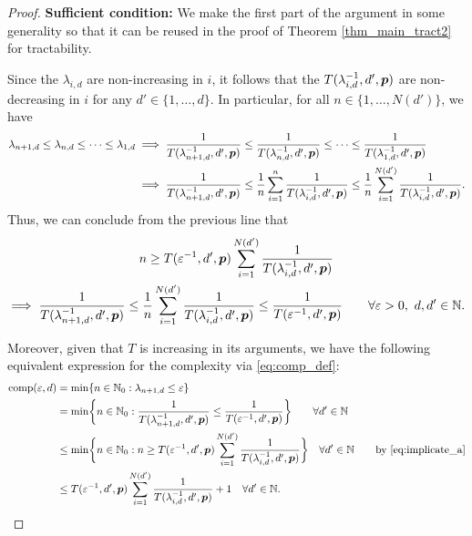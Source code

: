 \documentclass[11pt,a4paper]{article}
\begin{document}
\begin{proof}
\textbf{Sufficient condition:}\newline
We make the first part of the argument in some generality so that it can be reused in the proof of Theorem \ref{thm_main_tract2} for tractability.

Since the $\lambda_{i,d}$ are non-increasing in $i$, it follows that the $T(\lambda_{i,d}^{-1},d',\boldsymbol{p})$ are non-decreasing in $i$ for any $d'\in\{1, \ldots, d\}$. In particular, for all $n\in \{1, \ldots, N(d')\}$, we have
\begin{align*}
    \lambda_{n+1,d} \le \lambda_{n,d} \le \cdots \le \lambda_{1,d}
    & \implies \frac{1}{T(\lambda_{n+1, d}^{-1},d',\boldsymbol{p})} \le \frac{1}{T(\lambda_{n, d}^{-1},d',\boldsymbol{p})} \le \cdots \le \frac{1}{T(\lambda_{1, d}^{-1},d',\boldsymbol{p})} \\
    & \implies \frac{1}{T(\lambda_{n+1, d}^{-1},d',\boldsymbol{p}) }
    \le \frac 1n \sum_{i=1}^n  \frac{1}{T(\lambda_{i, d}^{-1},d',\boldsymbol{p}) }
    \le \frac 1n \sum_{i=1}^{N(d')}  \frac{1}{T(\lambda_{i, d}^{-1},d',\boldsymbol{p})}.
\end{align*}
Thus, we can conclude from the previous line that
\begin{multline} \label{eq:implicate_a}
    n \ge T(\varepsilon^{-1},d',\boldsymbol{p}) \sum_{i=1}^{N(d')} \frac{1}{T(\lambda_{i, d}^{-1},d',\boldsymbol{p})} \\
   \implies   \frac{1}{T(\lambda_{n+1, d}^{-1},d',\boldsymbol{p})} \le
   \frac 1n \sum_{i=1}^{N(d')} \frac{1}{T(\lambda_{i, d}^{-1},d',\boldsymbol{p}) } \le \frac{1}{T(\varepsilon^{-1},d',\boldsymbol{p})} \qquad \forall \varepsilon > 0, \ d,d' \in \mathbb{N}.
\end{multline}

Moreover, given that $T$ is increasing in its arguments, we have the following equivalent expression for the complexity via \eqref{eq:comp_def}:
    \begin{align} %
    \nonumber
    \comp(\varepsilon, d) & = \min \{n \in \natzero : \lambda_{n+1, d} \le \varepsilon\} \\
    \nonumber
    & = \min \biggl\{n \in \natzero : \frac{1}{T(\lambda_{n+1,d}^{-1},d',\vp)}\le \frac{1}{T(\varepsilon^{-1},d',\vp) }\biggr\} \qquad \forall d' \in \naturals\\
    \nonumber
    & \le  \min \biggl\{n \in \natzero : n \ge T(\varepsilon^{-1},d',\vp) \sum_{i=1}^{N(d')} \frac{1}{T(\lambda_{i, d}^{-1},d',\vp)} \biggr\} \quad \forall d' \in \naturals \qquad \text{by \eqref{eq:implicate_a}} \\
    & \le  T(\varepsilon^{-1},d',\vp) \sum_{i=1}^{N(d')} \frac{1}{T(\lambda_{i, d}^{-1},d',\vp)} + 1 \quad \forall d' \in \naturals. \label{eq:compUP}
\end{align}


\end{proof}
\end{document}
